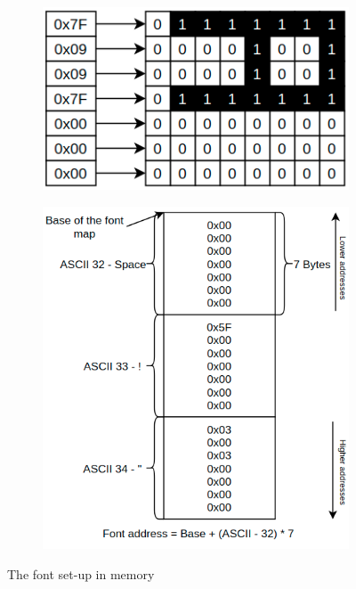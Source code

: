 \begin{figure}[H]
	\begin{subfigure}{0.5\linewidth}
		\includegraphics[width=\linewidth]{figures/font.png}
	\end{subfigure}
	\begin{subfigure}{0.5\linewidth}
		\includegraphics[width=\linewidth]{figures/fontmap.png}
	\end{subfigure}
	

	\caption{The font set-up in memory}
	\label{fig:fontexample}
\end{figure} 




